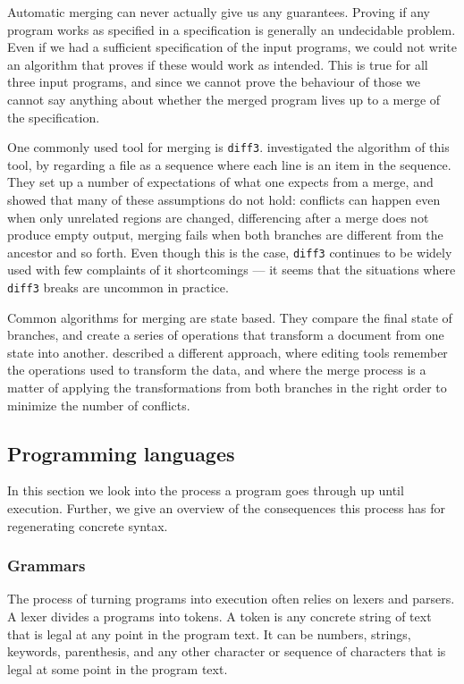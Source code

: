 \documentclass[11pt]{article}
\begin{document}
Automatic merging can never actually give us any guarantees. Proving if any program works as specified in a specification is generally an undecidable problem. Even if we had a sufficient specification of the input programs, we could not write an algorithm that proves if these would work as intended. This is true for all three input programs, and since we cannot prove the behaviour of those we cannot say anything about whether the merged program lives up to a merge of the specification.

One commonly used tool for merging is \texttt{diff3}. \citet{Khanna} investigated the algorithm of this tool, by regarding a file as a sequence where each line is an item in the sequence. They set up a number of expectations of what one expects from a merge, and showed that many of these assumptions do not hold: conflicts can happen even when only unrelated regions are changed, differencing after a merge does not produce empty output, merging fails when both branches are different from the ancestor and so forth. Even though this is the case, \texttt{diff3} continues to be widely used with few complaints of it shortcomings --- it seems that the situations where \texttt{diff3} breaks are uncommon in practice.

Common algorithms for merging are state based. They compare the final state of branches, and create a series of operations that transform a document from one state into another. \citet{Lippe} described a different approach, where editing tools remember the operations used to transform the data, and where the merge process is a matter of applying the transformations from both branches in the right order to minimize the number of conflicts.

\subsection{Programming languages}
In this section we look into the process a program goes through up until execution. Further, we give an overview of the consequences this process has for regenerating concrete syntax.

\subsubsection{Grammars}
The process of turning programs into execution often relies on lexers and parsers. A lexer divides a programs into tokens. A token is any concrete string of text that is legal at any point in the program text. It can be numbers, strings, keywords, parenthesis, and any other character or sequence of characters that is legal at some point in the program text. 
\end{document}
